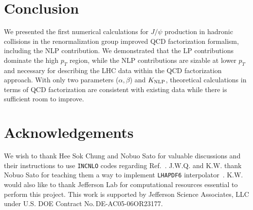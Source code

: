 \documentclass[Physsubmission, Phys]{SciPost}
\begin{document}
\section{Conclusion}
\label{sec:conclusion}

We presented the first numerical calculations for $J/\psi$ production in hadronic collisions in the renormalization group improved QCD factorization formalism, including the NLP contribution. We demonstrated that the LP contributions dominate the high $p_T$ region, while the NLP contributions are sizable at lower $p_T$ and necessary for describing the LHC data within the QCD factorization approach.  With only two parameters ($\alpha,\beta$) and $K_{\rm NLP}$, theoretical calculations in terms of QCD factorization are consistent with existing data while there is sufficient room to improve.


\section*{Acknowledgements}
We wish to thank Hee Sok Chung and Nobuo Sato for valuable discussions and their instructions to use \texttt{INCNLO} codes regarding Ref.~\cite{Aversa:1988vb}. J.W.Q. and K.W. thank Nobuo Sato for teaching them a way to implement \texttt{LHAPDF6} interpolator~\cite{Buckley:2014ana}. 
K.W. would also like to thank Jefferson Lab for computational resources essential to perform this project. This work is supported by Jefferson Science Associates, LLC under U.S. DOE Contract No.\,DE-AC05-06OR23177.








\nolinenumbers
\end{document}
